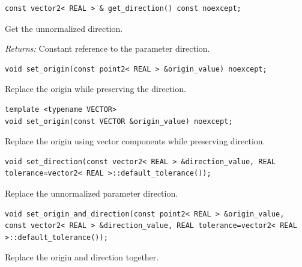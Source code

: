 \par\noindent\begin{minipage}{\linewidth}
\begin{lstlisting}[style=apireference]
const vector2< REAL > & get_direction() const noexcept;
\end{lstlisting}
{\footnotesize Get the unnormalized direction.\par}
{\footnotesize\textit{Returns:} Constant reference to the parameter direction.\par}
\end{minipage}\par\vspace{1pt}
\par\noindent\begin{minipage}{\linewidth}
\begin{lstlisting}[style=apireference]
void set_origin(const point2< REAL > &origin_value) noexcept;
\end{lstlisting}
{\footnotesize Replace the origin while preserving the direction.\par}
\end{minipage}\par\vspace{1pt}
\par\noindent\begin{minipage}{\linewidth}
\begin{lstlisting}[style=apireference]
template <typename VECTOR>
void set_origin(const VECTOR &origin_value) noexcept;
\end{lstlisting}
{\footnotesize Replace the origin using vector components while preserving direction.\par}
\end{minipage}\par\vspace{1pt}
\par\noindent\begin{minipage}{\linewidth}
\begin{lstlisting}[style=apireference]
void set_direction(const vector2< REAL > &direction_value, REAL tolerance=vector2< REAL >::default_tolerance());
\end{lstlisting}
{\footnotesize Replace the unnormalized parameter direction.\par}
\end{minipage}\par\vspace{1pt}
\par\noindent\begin{minipage}{\linewidth}
\begin{lstlisting}[style=apireference]
void set_origin_and_direction(const point2< REAL > &origin_value, const vector2< REAL > &direction_value, REAL tolerance=vector2< REAL >::default_tolerance());
\end{lstlisting}
{\footnotesize Replace the origin and direction together.\par}
\end{minipage}\par\vspace{1pt}
